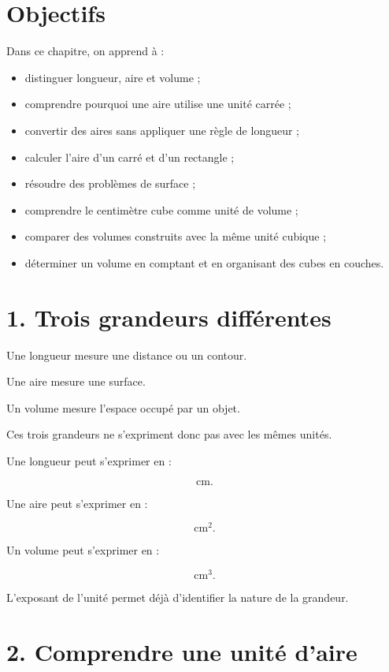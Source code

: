 
\section{Objectifs}

Dans ce chapitre, on apprend à :

\begin{itemize}
\item distinguer longueur, aire et volume ;
\item comprendre pourquoi une aire utilise une unité carrée ;
\item convertir des aires sans appliquer une règle de longueur ;
\item calculer l’aire d’un carré et d’un rectangle ;
\item résoudre des problèmes de surface ;
\item comprendre le centimètre cube comme unité de volume ;
\item comparer des volumes construits avec la même unité cubique ;
\item déterminer un volume en comptant et en organisant des cubes en couches.
\end{itemize}

\section{1. Trois grandeurs différentes}

Une longueur mesure une distance ou un contour.

Une aire mesure une surface.

Un volume mesure l’espace occupé par un objet.

Ces trois grandeurs ne s’expriment donc pas avec les mêmes unités.

Une longueur peut s’exprimer en :

\[
\text{cm}.
\]

Une aire peut s’exprimer en :

\[
\text{cm}^2.
\]

Un volume peut s’exprimer en :

\[
\text{cm}^3.
\]

L’exposant de l’unité permet déjà d’identifier la nature de la grandeur.

\section{2. Comprendre une unité d’aire}


